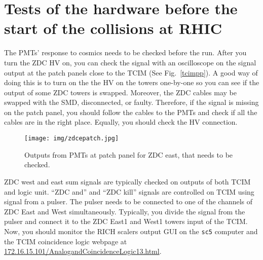 \section{Tests of the hardware before the start of the collisions at RHIC}
The PMTs' response to cosmics needs to be checked before the run. After you turn the ZDC HV on, you can check the signal with an oscilloscope on the signal output at the patch panels close to the TCIM (See Fig.\ \ref{tcimpp}). A good way of doing this is to turn on the the HV on the towers one-by-one so you can see if the output of some ZDC towers is swapped.
Moreover, the ZDC cables may be swapped with the SMD, disconnected, or faulty. Therefore, if the signal is missing on the patch panel, you should follow the cables to the PMTs and check if all the cables are in the right place. Equally, you should check the HV connection.

\begin{figure}[htb]
\begin{center}
\texttt{[image: img/zdcepatch.jpg]}
\end{center}
\caption{Outputs from PMTs at patch panel for ZDC east, that needs to be checked.}
\label{zdcepatch}
\end{figure}

ZDC west and east sum signals are typically checked on outputs of both TCIM and logic unit. ``ZDC and'' and ``ZDC kill'' signals are controlled on TCIM using  signal from a pulser. The pulser needs to be connected to one of the channels of ZDC East and West simultaneously. Typically, you divide the signal from the pulser and connect it to the ZDC East1 and West1 towers input of the TCIM. Now, you should monitor the RICH scalers output GUI on the \texttt{sc5} computer and the TCIM coincidence logic webpage at \url{172.16.15.101/AnalogandCoincidenceLogic13.html}.
